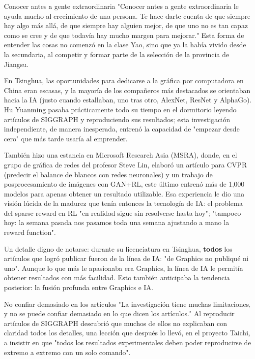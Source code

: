 \documentclass[a4paper]{article}
\begin{document}
\begin{importantbox}{Conocer antes a gente extraordinaria}
"Conocer antes a gente extraordinaria le ayuda mucho al crecimiento de una persona. Te hace darte cuenta de que siempre hay algo más allá, de que siempre hay alguien mejor, de que uno no es tan capaz como se cree y de que todavía hay mucho margen para mejorar." Esta forma de entender las cosas no comenzó en la clase Yao, sino que ya la había vivido desde la secundaria, al competir y formar parte de la selección de la provincia de Jiangsu.
\end{importantbox}

En Tsinghua, las oportunidades para dedicarse a la gráfica por computadora en China eran escasas, y la mayoría de los compañeros más destacados se orientaban hacia la IA (justo cuando estallaban, uno tras otro, AlexNet, ResNet y AlphaGo). Hu Yuanming pasaba prácticamente todo su tiempo en el dormitorio leyendo artículos de SIGGRAPH y reproduciendo sus resultados; esta investigación independiente, de manera inesperada, entrenó la capacidad de "empezar desde cero" que más tarde usaría al emprender.

También hizo una estancia en Microsoft Research Asia (MSRA), donde, en el grupo de gráfica de redes del profesor Steve Lin, elaboró un artículo para CVPR (predecir el balance de blancos con redes neuronales) y un trabajo de posprocesamiento de imágenes con GAN+RL, este último entrenó más de 1,000 modelos para apenas obtener un resultado utilizable. Esa experiencia le dio una visión lúcida de la madurez que tenía entonces la tecnología de IA: el problema del sparse reward en RL "en realidad sigue sin resolverse hasta hoy"; "tampoco hoy: la semana pasada nos pasamos toda una semana ajustando a mano la reward function".

Un detalle digno de notarse: durante su licenciatura en Tsinghua, \textbf{todos} los artículos que logró publicar fueron de la línea de IA: "de Graphics no publiqué ni uno". Aunque lo que más le apasionaba era Graphics, la línea de IA le permitía obtener resultados con más facilidad. Esto también anticipaba la tendencia posterior: la fusión profunda entre Graphics e IA.

\begin{warningbox}{No confiar demasiado en los artículos}
"La investigación tiene muchas limitaciones, y no se puede confiar demasiado en lo que dicen los artículos." Al reproducir artículos de SIGGRAPH descubrió que muchos de ellos no explicaban con claridad todos los detalles, una lección que después lo llevó, en el proyecto Taichi, a insistir en que "todos los resultados experimentales deben poder reproducirse de extremo a extremo con un solo comando".
\end{warningbox}
\end{document}
